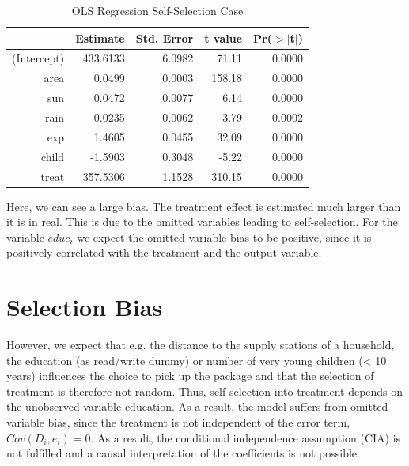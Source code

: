 \begin{enumerate}
\begin{table}[h!]
\centering
\begin{threeparttable}
\caption{OLS Regression Self-Selection Case} \label{tab:reg2}
\begin{tabular}{rrrrr}
  \hline
 & Estimate & Std. Error & t value & Pr({$>$}{$|$}t$|$) \\ 
  \hline
(Intercept) & 433.6133 & 6.0982 & 71.11 & 0.0000 \\ 
  area & 0.0499 & 0.0003 & 158.18 & 0.0000 \\ 
  sun & 0.0472 & 0.0077 & 6.14 & 0.0000 \\ 
  rain & 0.0235 & 0.0062 & 3.79 & 0.0002 \\ 
  exp & 1.4605 & 0.0455 & 32.09 & 0.0000 \\ 
  child & -1.5903 & 0.3048 & -5.22 & 0.0000 \\ 
  treat & 357.5306 & 1.1528 & 310.15 & 0.0000 \\ 
   \hline
\end{tabular}
\end{threeparttable}
\end{table}

Here, we can see a large bias. The treatment effect is estimated much larger than it is in real. This is due to the omitted variables leading to self-selection. For the variable $\textit{educ}_i$ we expect the omitted variable bias to be positive, since it is positively correlated with the treatment and the output variable. 

\end{enumerate}


\section{Selection Bias} \label{sec:selection}

However, we expect that e.g. the distance to the supply stations of a household, the education (as read/write dummy) or number of very young children (< 10 years) influences the choice to pick up the package and that the selection of treatment is therefore not random. Thus, self-selection into treatment depends on the unobserved variable education. As a result, the model suffers from omitted variable bias, since the treatment is not independent of the error term, $Cov(\textit{D}_i, \textit{e}_i) = 0$. As a result, the conditional independence assumption (CIA) is not fulfilled and a causal interpretation of the coefficients is not possible.

